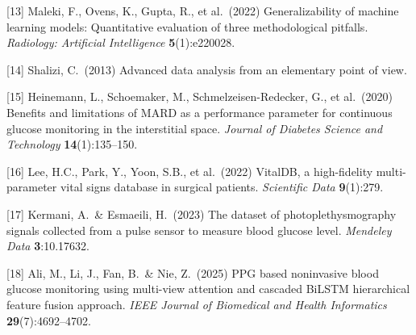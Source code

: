 \documentclass{article}
\begin{document}
[13] Maleki, F., Ovens, K., Gupta, R., et al.\ (2022)
Generalizability of machine learning models: Quantitative evaluation of three methodological pitfalls.
{\it Radiology: Artificial Intelligence} {\bf 5}(1):e220028.

[14] Shalizi, C.\ (2013)
Advanced data analysis from an elementary point of view.

[15] Heinemann, L., Schoemaker, M., Schmelzeisen-Redecker, G., et al.\ (2020)
Benefits and limitations of MARD as a performance parameter for continuous glucose monitoring in the interstitial space.
{\it Journal of Diabetes Science and Technology} {\bf 14}(1):135--150.


[16] Lee, H.C., Park, Y., Yoon, S.B., et al.\ (2022)
VitalDB, a high-fidelity multi-parameter vital signs database in surgical patients.
{\it Scientific Data} {\bf 9}(1):279.

[17] Kermani, A.\ \& Esmaeili, H.\ (2023)
The dataset of photoplethysmography signals collected from a pulse sensor to measure blood glucose level.
{\it Mendeley Data} {\bf 3}:10.17632.

[18] Ali, M., Li, J., Fan, B.\ \& Nie, Z.\ (2025)
PPG based noninvasive blood glucose monitoring using multi-view attention and cascaded BiLSTM hierarchical feature fusion approach.
{\it IEEE Journal of Biomedical and Health Informatics} {\bf 29}(7):4692--4702.

% 
\end{document}
